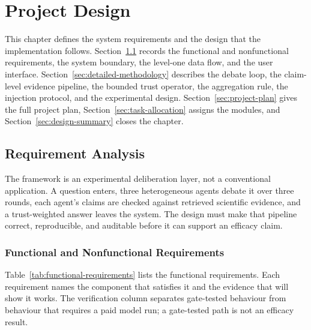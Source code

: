 \chapter{Project Design}\label{chapter:design}

This chapter defines the system requirements and the design that the implementation follows. Section~\ref{sec:requirement-analysis} records the functional and nonfunctional requirements, the system boundary, the level-one data flow, and the user interface. Section~\ref{sec:detailed-methodology} describes the debate loop, the claim-level evidence pipeline, the bounded trust operator, the aggregation rule, the injection protocol, and the experimental design. Section~\ref{sec:project-plan} gives the full project plan, Section~\ref{sec:task-allocation} assigns the modules, and Section~\ref{sec:design-summary} closes the chapter.

\section{Requirement Analysis}\label{sec:requirement-analysis}

The framework is an experimental deliberation layer, not a conventional application. A question enters, three heterogeneous agents debate it over three rounds, each agent's claims are checked against retrieved scientific evidence, and a trust-weighted answer leaves the system. The design must make that pipeline correct, reproducible, and auditable before it can support an efficacy claim.

\subsection{Functional and Nonfunctional Requirements}\label{subsec:requirements}

Table~\ref{tab:functional-requirements} lists the functional requirements. Each requirement names the component that satisfies it and the evidence that will show it works. The verification column separates gate-tested behaviour from behaviour that requires a paid model run; a gate-tested path is not an efficacy result.

